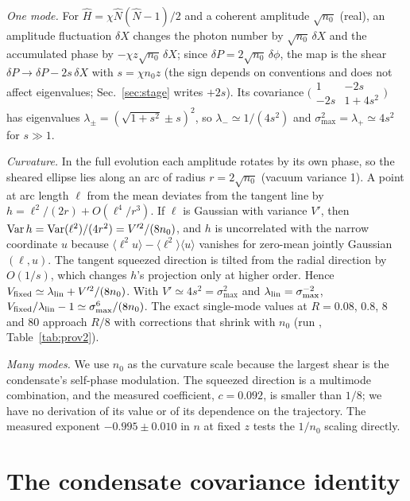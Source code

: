 \documentclass[aps,pra,twocolumn,superscriptaddress,nofootinbib,floatfix]{revtex4-2}
\newcommand{\smax}{\sigma_{\max}}
\DeclareRobustCommand{\run}[1]{{\small\path{#1}}}
\begin{document}
\textit{One mode.} For $\hat H=\chi\hat N(\hat N-1)/2$ and a coherent amplitude $\sqrt{n_0}$ (real), an amplitude
fluctuation $\delta X$ changes the photon number by $\sqrt{n_0}\,\delta X$ and the accumulated phase by
$-\chi z\sqrt{n_0}\,\delta X$; since $\delta P=2\sqrt{n_0}\,\delta\phi$, the map is the shear $\delta P\to\delta P-2s\,\delta X$
with $s=\chi n_0z$ (the sign depends on conventions and does not affect eigenvalues; Sec.~\ref{sec:stage} writes $+2s$). Its
covariance $\bigl(\begin{smallmatrix}1&-2s\\-2s&1+4s^2\end{smallmatrix}\bigr)$ has eigenvalues
$\lambda_\pm=(\sqrt{1+s^2}\pm s)^2$, so $\lambda_-\simeq1/(4s^2)$ and $\smax^2=\lambda_+\simeq4s^2$ for $s\gg1$.

\textit{Curvature.} In the full evolution each amplitude rotates by its own phase, so the sheared ellipse lies along an
arc of radius $r=2\sqrt{n_0}$ (vacuum variance 1). A point at arc length $\ell$ from the mean deviates from the tangent line
by $h=\ell^2/(2r)+O(\ell^4/r^3)$. If $\ell$ is Gaussian with variance $V'$, then ${\rm Var}\,h={\rm Var}(\ell^2)/(4r^2)=V'^2/(8n_0)$,
and $h$ is uncorrelated with the narrow coordinate $u$ because $\langle\ell^2u\rangle-\langle\ell^2\rangle\langle u\rangle$
vanishes for zero-mean jointly Gaussian $(\ell,u)$. The tangent squeezed direction is tilted from the radial direction by
$O(1/s)$, which changes $h$'s projection only at higher order. Hence
$V_{\rm fixed}\simeq\lambda_{\rm lin}+V'^2/(8n_0)$. With $V'\simeq4s^2=\smax^2$ and $\lambda_{\rm lin}=\smax^{-2}$,
$V_{\rm fixed}/\lambda_{\rm lin}-1\simeq\smax^6/(8n_0)$. The exact single-mode values at $R=0.08$, 0.8, 8 and 80 approach
$R/8$ with corrections that shrink with $n_0$ (run \run{2026-10-18-gpt-b-kerr-exact}, Table~\ref{tab:prov2}).

\textit{Many modes.} We use $n_0$ as the curvature scale because the largest shear is the condensate's self-phase
modulation. The squeezed direction is a multimode combination, and the measured coefficient, $c=0.092$, is smaller than
$1/8$; we have no derivation of its value or of its dependence on the trajectory. The measured exponent $-0.995\pm0.010$ in
$n$ at fixed $z$ tests the $1/n_0$ scaling directly.

\section{The condensate covariance identity}\label{app:own}
\end{document}
